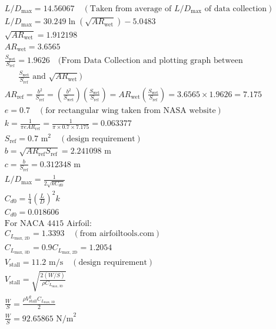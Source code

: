 \documentclass[12 pt]{article}
\begin{document}
\begin{align*}
& L/D_{\text{max}} = 14.56067 \quad (\text{Taken from average of } L/D_{\text{max}} \text{ of data collection}) \\ 
& L/D_{\text{max}} = 30.249 \ln(\sqrt{AR_{\text{wet}}}) - 5.0483 \\
& \sqrt{AR_{\text{wet}}} = 1.912198 \\
& AR_{\text{wet}} = 3.6565 \\
& \frac{S_{\text{wet}}}{S_{\text{ref}}} = 1.9626 \quad (\text{From Data Collection and plotting graph between} \\
& \quad \text{ } \frac{S_{\text{wet}}}{S_{\text{ref}}} \text{ and } \sqrt{AR_{\text{wet}}}) \\
& AR_{\text{ref}} = \frac{b^2}{S_{\text{ref}}} = \left(\frac{b^2}{S_{\text{wet}}}\right) \left(\frac{S_{\text{wet}}}{S_{\text{ref}}}\right) = AR_{\text{wet}} \left(\frac{S_{\text{wet}}}{S_{\text{ref}}}\right) = 3.6565 \times 1.9626 = 7.175 \\
& e = 0.7 \quad (\text{for rectangular wing taken from NASA website}) \\
& k = \frac{1}{\pi e AR_{\text{ref}}} = \frac{1}{\pi \times 0.7 \times 7.175} = 0.063377 \\
& S_{\text{ref}} = 0.7 \text{ m}^2 \quad (\text{design requirement}) \\
& b = \sqrt{AR_{\text{ref}} S_{\text{ref}}} = 2.241098 \text{ m} \\
& c = \frac{b}{S_{\text{ref}}} = 0.312348 \text{ m} \\
& L/D_{\text{max}} = \frac{1}{2\sqrt{k C_{d0}}} \\
& C_{d0} = \frac{1}{4} \left(\frac{L}{D}\right)^2 k \\
& C_{d0} = 0.018606 \\
& \text{For NACA 4415 Airfoil:} \\
& C_{L_{\text{max, 2D}}} = 1.3393 \quad (\text{from airfoiltools.com}) \\
& C_{L_{\text{max, 3D}}} = 0.9 C_{L_{\text{max, 2D}}} = 1.2054 \\
& V_{\text{stall}} = 11.2 \text{ m/s} \quad (\text{design requirement}) \\
& V_{\text{stall}} = \sqrt{\frac{2(W/S)}{\rho C_{L_{\text{max, 3D}}}}} \\
& \frac{W}{S} = \frac{\rho V_{\text{stall}}^2 C_{L_{\text{max, 3D}}}}{2} \\
& \frac{W}{S} = 92.65865 \text{ N/m}^2 \\
\end{align*}
\end{document}
